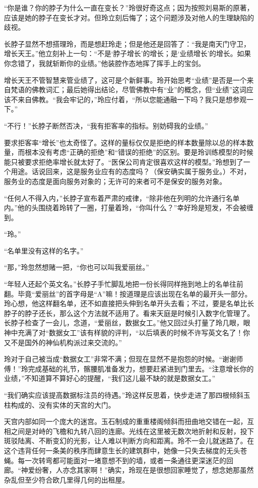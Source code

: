 “你是谁？你的脖子为什么一直在变长？”玲很好奇这点；因为按照刘易斯的原著，应该是她的脖子在变长才对。但玲立刻后悔了；这个问题涉及对他人的生理缺陷的歧视。

长脖子显然不想搭理玲，而是想赶玲走；但是他还是回答了：“我是南天门守卫，增长天王。”他立刻补上一句：“不是‘脖子增长’的增长；是‘业绩增长’的增长。如果你念错了，我就斩断你的业绩。”他装腔作态地挥了挥手上的宝剑。

增长天王不管智慧来管业绩了，这可是个新鲜事。玲开始思考“业绩”是否是一个来自梵语的佛教词汇；最后她得出结论，尽管佛教中有“业”的概念，但“业绩”这词应该不来自佛教。“我会牢记的，”玲应付着，“所以您能通融一下吗？我只是想参观一下。”

“不行！”长脖子断然否决，“我有拒客率的指标。别妨碍我的业绩。”

要求拒客率“增长”也太奇怪了。这样的量标仅仅是拒绝的样本数量除以总的样本数量，而根本没有考虑“正确的拒绝”和“错误的拒绝”的区别。要是玲训练模型的时候能只被要求拒绝率增长就太好了。“医保公司肯定很喜欢这样的模型。”玲想到了一个用途。话说回来，这是服务业应有的态度吗？（保安确实属于服务业。）不对，服务业的态度是面向服务对象的；无许可的来者可不是保安的服务对象。

“任何人不得入内，”长脖子宣布着严肃的戒律，“除非他在列明的允许通行名单内。”他的头围绕着玲转了一圈，打量着玲，“你叫什么？”幸好玲是短发，不会被缠到。

“玲。”

“名单里没有这样的名字。”

“那，”玲忽然想赌一把，“你也可以叫我爱丽丝。”

“年轻人还起个英文名。”长脖子手忙脚乱地把一份长得同样拖到地上的名单往前翻。毕竟“爱丽丝”的首字母是“A”嘛！按道理是应该出现在名单的最开头一部分。玲心想，他这样翻名单，还不如直接把头伸到名单开头去看；不过，要是名单比长脖子的脖子还长，那么这个方法就不适用了。看来天庭是时候引入数字化管理了。长脖子检查了一会儿，念道，“爱丽丝，数据女工。”他又回过头打量了玲几眼，眼神中充满了对“数据女工”该有样貌的评判，“以后填表的时候不许写英文名了！你又不是国外的神仙机构派过来交流的。”

玲对于自己被当成“数据女工”非常不满；但现在显然不是抱怨的时候。“谢谢师傅！”玲完成基础的礼节，髂腰肌准备发力，想要赶紧进到门里去。“注意增长你的业绩，”不知道算不算好心的提醒，“我们这儿最不缺的就是数据女工。”

“我们确实应该提高数据标注员的待遇。”玲这样反思着，快步走进了那四根倾斜玉柱构成的、没有实体的天宫的大门。

天宫内部如同一个庞大的迷宫。玉石制成的重重楼阁倾斜而扭曲地交错在一起，互相之间是对峙的飞檐和九转八回的连廊。光线在这里被无数次地折射和反射，投下斑驳陆离、不断变幻的光影，让人难以判断方向和距离。玲不一会儿就迷路了。在这个违背任何一条美的秩序而肆意生长的建筑群中，她像一只失去梯度的无头苍蝇。每一次转弯都可能面对一堵意想不到的墙，或者一条通往更深迷茫的回廊。“神爱纷奢，人亦念其家啊！”确实，玲现在是很想回家睡觉了，想念她那虽然杂乱但至少符合欧几里得几何的出租屋。

